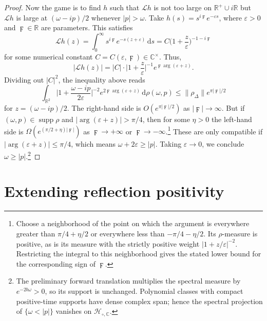 \documentclass[11pt, letterpaper, reqno]{amsart}
\theoremstyle{definition}
\theoremstyle{remark}
\newcommand{\bbC}{\mathbb{C}}
\newcommand{\bbR}{\mathbb{R}}
\newcommand{\calH}{\mathcal{H}}
\newcommand{\calL}{\mathcal{L}}
\newcommand{\dd}{\,\mathrm{d}}
\begin{document}
\begin{proof}
    Now the game is to find $h$ such that $\calL h$ is not too large on
    $\bbR^+\cup i\bbR$ but $\calL h$ is large at $(\omega-ip)/2$
    whenever $|p|>\omega$. Take $h(s)=s^{i\digamma}e^{-\varepsilon s}$,
    where $\varepsilon>0$ and $\digamma\in\bbR$ are parameters. This satisfies
    \begin{equation}
        \calL h(z)=\int_0^\infty s^{i\digamma}e^{-s(z+\varepsilon)}\dd s
        =C\Big(1+\frac z\varepsilon\Big)^{-1-i\digamma}
    \end{equation}
    for some numerical constant $C=C(\varepsilon,\digamma)\in\bbC^\times$.
    Thus,
    \begin{equation}
        |\calL h(z)|=|C|\cdot\Big|1+\frac z\varepsilon\Big|^{-1}
        e^{\digamma\operatorname{arg}(\varepsilon+z)}.
    \end{equation}
    Dividing out $|C|^2$, the inequality above reads
    \begin{equation}
        \int_{\bbR^2}\Big|1+\frac{\omega-ip}{2\varepsilon}\Big|^{-2}
        e^{2\digamma\operatorname{arg}(\varepsilon+z)}\dd\rho(\omega,p)
        \leq\lVert\rho_\Delta\rVert e^{\pi|\digamma|/2}
    \end{equation}
    for $z=(\omega-ip)/2$. The right-hand side is
    $O(e^{\pi|\digamma|/2})$ as $|\digamma|\to\infty$.
    But if $(\omega,p)\in\operatorname{supp}\rho$ and
    $|\operatorname{arg}(\varepsilon+z)|>\pi/4$, then for some $\eta>0$
    the left-hand side is $\Omega(e^{(\pi/2+\eta)|\digamma|})$
    as $\digamma\to+\infty$ or $\digamma\to-\infty$.\footnote{Choose a
    neighborhood of the point on which the argument is everywhere
    greater than $\pi/4+\eta/2$ or everywhere less than
    $-\pi/4-\eta/2$. Its $\rho$-measure is positive, as is its measure
    with the strictly positive weight $|1+z/\varepsilon|^{-2}$.
    Restricting the integral to this neighborhood gives the stated
    lower bound for the corresponding sign of $\digamma$.}
    These are only compatible if $|\operatorname{arg}(\varepsilon+z)|\leq\pi/4$,
    which means $\omega+2\varepsilon\geq|p|$.
    Taking $\varepsilon\to0$, we conclude $\omega\geq|p|$.\footnote{The
    preliminary forward translation multiplies the spectral measure by
    $e^{-2b\omega}>0$, so its support is unchanged. Polynomial classes
    with compact positive-time supports have dense complex span; hence
    the spectral projection of $\{\omega<|p|\}$ vanishes on
    $\calH_{\circ,\bbC}$.}
\end{proof}


\section{Extending reflection positivity}\label{sec:extend-RP}
\enlargethispage{2pt}
\end{document}
